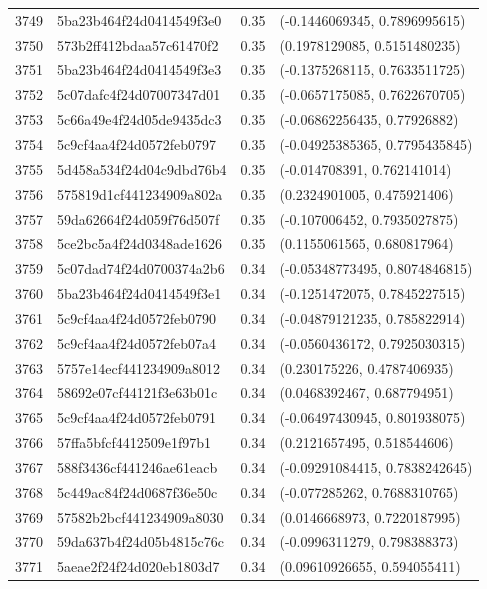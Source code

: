 \begin{table}[ht]
\begin{tabular}{rlrl}
  3749 & 5ba23b464f24d0414549f3e0 & 0.35 & (-0.1446069345, 0.7896995615) \\ 
  3750 & 573b2ff412bdaa57c61470f2 & 0.35 & (0.1978129085, 0.5151480235) \\ 
  3751 & 5ba23b464f24d0414549f3e3 & 0.35 & (-0.1375268115, 0.7633511725) \\ 
  3752 & 5c07dafc4f24d07007347d01 & 0.35 & (-0.0657175085, 0.7622670705) \\ 
  3753 & 5c66a49e4f24d05de9435dc3 & 0.35 & (-0.06862256435, 0.77926882) \\ 
  3754 & 5c9cf4aa4f24d0572feb0797 & 0.35 & (-0.04925385365, 0.7795435845) \\ 
  3755 & 5d458a534f24d04c9dbd76b4 & 0.35 & (-0.014708391, 0.762141014) \\ 
  3756 & 575819d1cf441234909a802a & 0.35 & (0.2324901005, 0.475921406) \\ 
  3757 & 59da62664f24d059f76d507f & 0.35 & (-0.107006452, 0.7935027875) \\ 
  3758 & 5ce2bc5a4f24d0348ade1626 & 0.35 & (0.1155061565, 0.680817964) \\ 
  3759 & 5c07dad74f24d0700374a2b6 & 0.34 & (-0.05348773495, 0.8074846815) \\ 
  3760 & 5ba23b464f24d0414549f3e1 & 0.34 & (-0.1251472075, 0.7845227515) \\ 
  3761 & 5c9cf4aa4f24d0572feb0790 & 0.34 & (-0.04879121235, 0.785822914) \\ 
  3762 & 5c9cf4aa4f24d0572feb07a4 & 0.34 & (-0.0560436172, 0.7925030315) \\ 
  3763 & 5757e14ecf441234909a8012 & 0.34 & (0.230175226, 0.4787406935) \\ 
  3764 & 58692e07cf44121f3e63b01c & 0.34 & (0.0468392467, 0.687794951) \\ 
  3765 & 5c9cf4aa4f24d0572feb0791 & 0.34 & (-0.06497430945, 0.801938075) \\ 
  3766 & 57ffa5bfcf4412509e1f97b1 & 0.34 & (0.2121657495, 0.518544606) \\ 
  3767 & 588f3436cf441246ae61eacb & 0.34 & (-0.09291084415, 0.7838242645) \\ 
  3768 & 5c449ac84f24d0687f36e50c & 0.34 & (-0.077285262, 0.7688310765) \\ 
  3769 & 57582b2bcf441234909a8030 & 0.34 & (0.0146668973, 0.7220187995) \\ 
  3770 & 59da637b4f24d05b4815c76c & 0.34 & (-0.0996311279, 0.798388373) \\ 
  3771 & 5aeae2f24f24d020eb1803d7 & 0.34 & (0.09610926655, 0.594055411) \\ 

\end{tabular}
\end{table}

